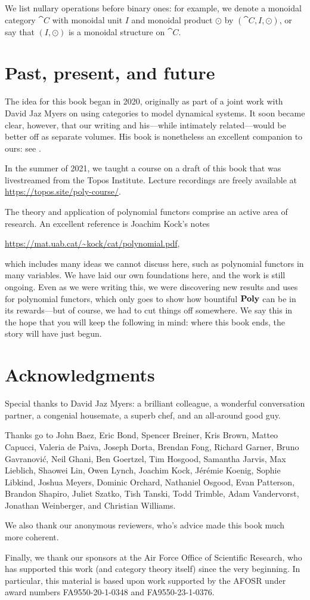 \documentclass[Book-Poly]{subfiles}
\begin{document}
We list nullary operations before binary ones: for example, we denote a monoidal category $\cat{C}$ with monoidal unit $I$ and monoidal product $\odot$ by $(\cat{C},I,\odot)$, or say that $(I,\odot)$ is a monoidal structure on $\cat{C}$.

\section*{Past, present, and future}

The idea for this book began in 2020, originally as part of a joint work with David Jaz Myers on using categories to model dynamical systems.
It soon became clear, however, that our writing and his---while intimately related---would be better off as separate volumes.
His book is nonetheless an excellent companion to ours: see \cite{jaz}.

In the summer of 2021, we taught a course on a draft of this book that was livestreamed from the Topos Institute.
Lecture recordings are freely available at \url{https://topos.site/poly-course/}.

The theory and application of polynomial functors comprise an active area of research. An excellent reference is Joachim Kock's notes
\begin{center}
\url{https://mat.uab.cat/~kock/cat/polynomial.pdf},
\end{center}
which includes many ideas we cannot discuss here, such as polynomial functors in many variables.
We have laid our own foundations here, and the work is still ongoing.
Even as we were writing this, we were discovering new results and uses for polynomial functors, which only goes to show how bountiful $\mathbf{Poly}$ can be in its rewards---but of course, we had to cut things off somewhere.
We say this in the hope that you will keep the following in mind: where this book ends, the story will have just begun.

\section*{Acknowledgments}

Special thanks to David Jaz Myers: a brilliant colleague, a wonderful conversation partner, a congenial housemate, a superb chef, and an all-around good guy.

Thanks go to John Baez, Eric Bond, Spencer Breiner, Kris Brown, Matteo Capucci, Valeria de Paiva, Joseph Dorta, Brendan Fong, Richard Garner, Bruno Gavranovi\'c, Neil Ghani, Ben Goertzel, Tim Hosgood, Samantha Jarvis, Max Lieblich, Shaowei Lin, Owen Lynch, Joachim Kock, J\'er\'emie Koenig, Sophie Libkind, Joshua Meyers, Dominic Orchard, Nathaniel Osgood, Evan Patterson, Brandon Shapiro, Juliet Szatko, Tish Tanski, Todd Trimble, Adam Vandervorst, Jonathan Weinberger, and Christian Williams.

We also thank our anonymous reviewers, who's advice made this book much more coherent.

Finally, we thank our sponsors at the Air Force Office of Scientific Research, who has supported this work (and category theory itself) since the very beginning. In particular, this material is based upon work supported by the AFOSR under award numbers FA9550-20-1-0348 and FA9550-23-1-0376. 
\end{document}
